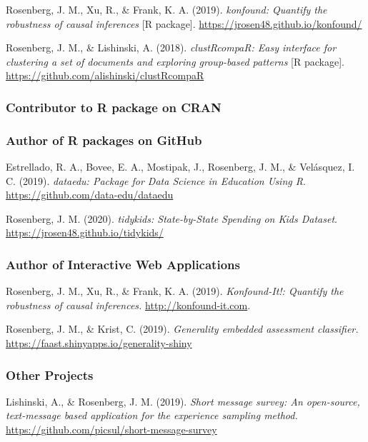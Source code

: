 \documentclass[
  14,
]{article}
\begin{document}
Rosenberg, J. M., Xu, R., \& Frank, K. A. (2019). \emph{konfound:
Quantify the robustness of causal inferences} {[}R package{]}.
\url{https://jrosen48.github.io/konfound/}

Rosenberg, J. M., \& Lishinski, A. (2018). \emph{clustRcompaR: Easy
interface for clustering a set of documents and exploring group-based
patterns} {[}R package{]}.
\url{https://github.com/alishinski/clustRcompaR}

\hypertarget{contributor-to-r-package-on-cran}{%
\subsubsection{Contributor to R package on
CRAN}\label{contributor-to-r-package-on-cran}}

\hypertarget{author-of-r-packages-on-github}{%
\subsubsection{Author of R packages on
GitHub}\label{author-of-r-packages-on-github}}

Estrellado, R. A., Bovee, E. A., Mostipak, J., Rosenberg, J. M., \&
Velásquez, I. C. (2019). \emph{dataedu: Package for Data Science in
Education Using R}. \url{https://github.com/data-edu/dataedu}

Rosenberg, J. M. (2020). \emph{tidykids: State-by-State Spending on Kids
Dataset}. \url{https://jrosen48.github.io/tidykids/}

\hypertarget{author-of-interactive-web-applications}{%
\subsubsection{Author of Interactive Web
Applications}\label{author-of-interactive-web-applications}}

Rosenberg, J. M., Xu, R., \& Frank, K. A. (2019). \emph{Konfound-It!:
Quantify the robustness of causal inferences.}
\url{http://konfound-it.com}.

Rosenberg, J. M., \& Krist, C. (2019). \emph{Generality embedded
assessment classifier.}
\url{https://faast.shinyapps.io/generality-shiny}

\hypertarget{other-projects}{%
\subsubsection{Other Projects}\label{other-projects}}

Lishinski, A., \& Rosenberg, J. M. (2019). \emph{Short message survey:
An open-source, text-message based application for the experience
sampling method.} \url{https://github.com/picsul/short-message-survey}
\end{document}
